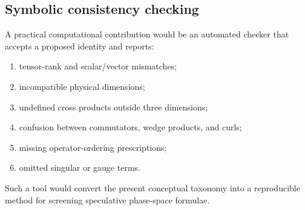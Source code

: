 \subsection{Symbolic consistency checking}

A practical computational contribution would be an automated checker that accepts a proposed identity and reports:
\begin{enumerate}[label=(\alph*)]
  \item tensor-rank and scalar/vector mismatches;
  \item incompatible physical dimensions;
  \item undefined cross products outside three dimensions;
  \item confusion between commutators, wedge products, and curls;
  \item missing operator-ordering prescriptions;
  \item omitted singular or gauge terms.
\end{enumerate}
Such a tool would convert the present conceptual taxonomy into a reproducible method for screening speculative phase-space formulae.
